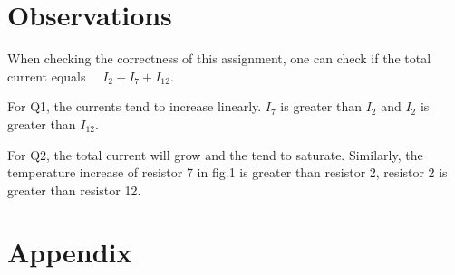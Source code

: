 \documentclass[12pt,a4paper]{article}
\begin{document}
\section{Observations}

When checking the correctness of this assignment, one can check if the total current equals 　$I_2 + I_7 + I_{12}$. 

For Q1, the currents tend to increase linearly. $I_7$ is greater than $I_2$ and $I_2$ is greater than $I_{12}$.

For Q2, the total current will grow and the tend to saturate. Similarly, the temperature increase of resistor 7 in fig.1 is greater than resistor 2, resistor 2 is greater than resistor 12. 
\newpage
\section{Appendix}
\end{document}
